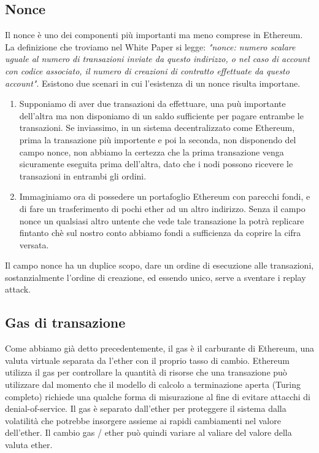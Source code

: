 \subsection*{Nonce}
Il nonce è uno dei componenti più importanti ma meno comprese in Ethereum. La definizione che troviamo nel White Paper si legge: \textit{"nonce: numero scalare uguale al numero di transazioni inviate da questo indirizzo, o nel caso di account con codice associato, il numero di creazioni di contratto effettuate da questo account"}. Esistono due scenari in cui l'esistenza di un nonce risulta importane.
\begin{enumerate}
	\item Supponiamo di aver due transazioni da effettuare, una puù importante dell'altra ma non disponiamo di un saldo sufficiente per pagare entrambe le transazioni. Se inviassimo, in un sistema decentralizzato come Ethereum, prima la transazione più importente e poi la seconda, non disponendo del campo nonce, non abbiamo la certezza che la prima transazione venga sicuramente eseguita prima dell'altra, dato che i nodi possono ricevere le transazioni in entrambi gli ordini.
	\item Immaginiamo ora di possedere un portafoglio Ethereum con parecchi fondi, e di fare un trasferimento di pochi ether ad un altro indirizzo. Senza il campo nonce un qualsiasi altro untente che vede tale transazione la potrà replicare fintanto chè sul nostro conto abbiamo fondi a sufficienza da coprire la cifra versata.
\end{enumerate}
Il campo nonce ha un duplice scopo, dare un ordine di esecuzione alle transazioni, sostanzialmente l'ordine di creazione, ed essendo unico, serve a sventare i replay attack.

\subsection{Gas di transazione}
Come abbiamo già detto precedentemente, il gas è il carburante di Ethereum, una valuta virtuale separata da l'ether con il proprio tasso di cambio. Ethereum utilizza il gas per controllare la quantità di risorse che una transazione può utilizzare dal momento che il modello di calcolo a terminazione aperta (Turing completo) richiede una qualche forma di misurazione al fine di evitare attacchi di denial-of-service. Il gas è separato dall'ether per proteggere il sistema dalla volatilità che potrebbe insorgere assieme ai rapidi cambiamenti nel valore dell'ether. Il cambio gas / ether può quindi variare al valiare del valore della valuta ether. 

